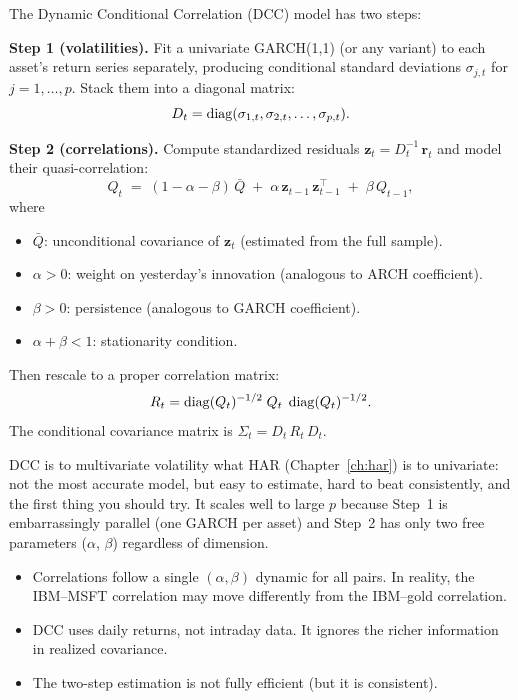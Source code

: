 \begin{keyidea}
The Dynamic Conditional Correlation (DCC) model has two steps:

\textbf{Step 1 (volatilities).}  Fit a univariate GARCH(1,1) (or any variant)
to each asset's return series separately, producing conditional standard
deviations $\sigma_{j,t}$ for $j = 1, \ldots, p$. Stack them into a diagonal
matrix:
\[
  D_t = \operatorname{diag}(\sigma_{1,t}, \sigma_{2,t}, \ldots, \sigma_{p,t}).
\]

\textbf{Step 2 (correlations).}  Compute standardized residuals
$\mathbf{z}_t = D_t^{-1}\,\mathbf{r}_t$ and model their quasi-correlation:
\begin{equation}\label{eq:dcc}
  Q_t \;=\; (1 - \alpha - \beta)\,\bar{Q}
  \;+\; \alpha\,\mathbf{z}_{t-1}\,\mathbf{z}_{t-1}^\top
  \;+\; \beta\, Q_{t-1},
\end{equation}
where
\begin{itemize}[nosep]
  \item $\bar{Q}$: unconditional covariance of $\mathbf{z}_t$ (estimated from
        the full sample).
  \item $\alpha > 0$: weight on yesterday's innovation (analogous to ARCH
        coefficient).
  \item $\beta > 0$: persistence (analogous to GARCH coefficient).
  \item $\alpha + \beta < 1$: stationarity condition.
\end{itemize}
Then rescale to a proper correlation matrix:
\[
  R_t = \operatorname{diag}(Q_t)^{-1/2}\; Q_t\; \operatorname{diag}(Q_t)^{-1/2}.
\]
The conditional covariance matrix is $\Sigma_t = D_t\, R_t\, D_t$.
\end{keyidea}

\begin{intuition}
DCC is to multivariate volatility what HAR (Chapter~\ref{ch:har}) is to
univariate: not the most accurate model, but easy to estimate, hard to beat
consistently, and the first thing you should try. It scales well to large $p$
because Step~1 is embarrassingly parallel (one GARCH per asset) and Step~2 has
only two free parameters ($\alpha$, $\beta$) regardless of dimension.
\end{intuition}

\begin{warning}
\begin{itemize}[nosep]
  \item Correlations follow a single $(\alpha, \beta)$ dynamic for all pairs.
        In reality, the IBM--MSFT correlation may move differently from the
        IBM--gold correlation.
  \item DCC uses daily returns, not intraday data. It ignores the richer
        information in realized covariance.
  \item The two-step estimation is not fully efficient (but it is consistent).
\end{itemize}
\end{warning}

